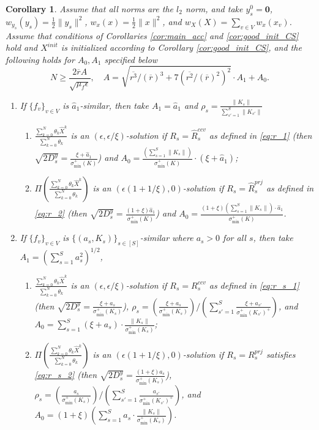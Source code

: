 \documentclass[10pt]{article}
\newcommand{\mb}{\mathbf}
\newtheorem{corollary}{Corollary}[section]
\begin{document}
\begin{corollary}\label{cor:main1_acc}
Assume that all norms are the $l_2$ norm, and take $y_s^0 = \mb 0$, $w_{y_s}(y_s) = \frac{1}{2}\|y_s\|^2$, $w_x(x) = \frac{1}{2}\|x\|^2$, and $w_X(X) = \sum_{v\in V} w_x(x_v)$. Assume that conditions of Corollaries \ref{cor:main_acc} and \ref{cor:good_init_CS} hold and $X^{init}$ is initialized according to Corollary \ref{cor:good_init_CS}, and the following holds for $A_0,A_1$ specified below
\begin{displaymath}
     N \geq \frac{2\overline{r}A}{\sqrt{\mu_f\epsilon} },\quad A = \sqrt{\overline{r^3}/(\overline{r})^3 + 7(\overline{r^2}/(\overline{r})^2)^2}\cdot A_1 +A_0.
\end{displaymath}

\begin{enumerate}
    \item If $\{f_v\}_{v\in V}$ is $\widehat{a}_1$-similar, then take $A_1 = \widehat{a}_1$ and $\rho_s =\frac{ \|K_s\|}{\sum_{s'=1}^S\|K_{s'}\|}$
    \begin{enumerate}
    \item $\frac{\sum_{k=0}^N \theta_k\widehat{X}^k}{\sum_{k=0}^N \theta_{k}}$ is an $(\epsilon,\epsilon/\xi)$-solution if $R_s=\widehat{R}_s^{ccv}$ as defined in \eqref{eq:r_1} (then $\sqrt{2D_s^y}= \frac{\xi + \widehat{a}_1}{\sigma_{\min}^+(K)}$) and $A_0 = \frac{(\sum_{s=1}^S\|K_s\|)}{\sigma_{\min}^+(K)}\cdot (\xi + \widehat{a}_1)$; 
\item $\Pi(\frac{\sum_{k=0}^N \theta_k\widehat{X}^k}{\sum_{k=0}^N \theta_{k}})$ is an $(\epsilon(1+1/\xi),0)$-solution if $R_s = \widehat{R}_s^{prj}$ as defined in \eqref{eq:r_2} (then $ \sqrt{2D_s^y}=\frac{(1+\xi) \widehat{a}_1}{\sigma_{\min}^+(K)}$) and $A_0= \frac{(1+\xi) (\sum_{s=1}^S \|K_s\|)\cdot \widehat{a}_1}{\sigma_{\min}^+(K)}$.
\end{enumerate}
\item If $\{f_v\}_{v\in V}$ is $\{(a_s,K_s)\}_{s\in [S]}$-similar where $a_s>0$ for all $s$, then take $A_1 = (\sum_{s=1}^S a_s^2)^{1/2}$,
\begin{enumerate}
    \item $\frac{\sum_{k=0}^N \theta_k\widehat{X}^k}{\sum_{k=0}^N \theta_{k}}$ is an $(\epsilon,\epsilon/\xi)$-solution if $R_s = R_s^{ccv}$ as defined in \eqref{eq:r_s_1} (then $\sqrt{2D_s^y}=\frac{\xi + a_s}{\sigma_{\min}^+(K_s)}$), $\rho_s = (\frac{\xi + a_s}{\sigma^+_{\min}(K_s)})/(\sum_{s'=1}^S \frac{\xi + a_{s'}}{\sigma^+_{\min}(K_{s'})^+})$, and $A_0=\sum_{s=1}^S (\xi + a_s)\cdot \frac{\|K_s\|}{\sigma_{\min}^+(K_s)}$; 
\item $\Pi(\frac{\sum_{k=0}^N \theta_k\widehat{X}^k}{\sum_{k=0}^N \theta_{k}})$ is an $(\epsilon(1+1/\xi),0)$-solution if $R_s = R_s^{prj}$ satisfies \eqref{eq:r_s_2} (then $\sqrt{2D_s^y}=\frac{(1+\xi )a_s}{\sigma_{\min}^+(K_s)}$), $\rho_s = (\frac{ a_s}{\sigma^+_{\min}(K_s)})/(\sum_{s'=1}^S \frac{ a_{s'}}{\sigma^+_{\min}(K_{s'})^+})$, and $A_0=(1+\xi)(\sum_{s=1}^S a_s\cdot \frac{\|K_s\|}{\sigma_{\min}^+(K_s)})$. 
\end{enumerate}
\end{enumerate}
\end{corollary}
\end{document}

